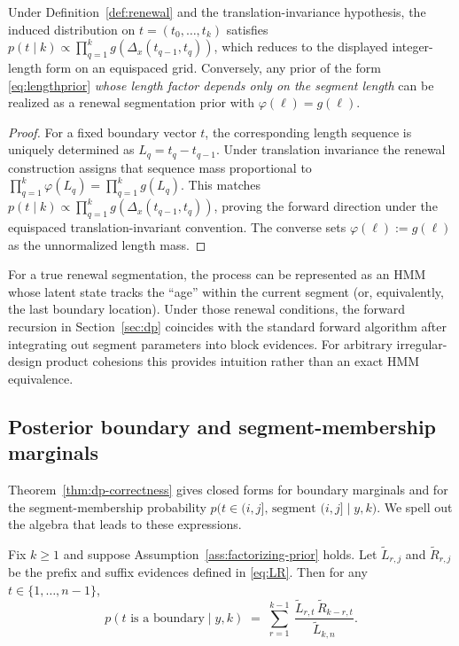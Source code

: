 \begin{proposition}
\label{prop:renewal-equivalence}
Under Definition~\ref{def:renewal} and the translation-invariance hypothesis,
the induced distribution on $t=(t_0,\dots,t_k)$ satisfies
$p(t\mid k)\propto \prod_{q=1}^k g(\Delta_x(t_{q-1},t_q))$, which reduces to the displayed integer-length form on an equispaced grid. Conversely, any prior of the form
\eqref{eq:lengthprior} \emph{whose length factor depends only on the segment length} can be
realized as a renewal segmentation prior with $\varphi(\ell)=g(\ell)$.
\end{proposition}

\begin{proof}
For a fixed boundary vector $t$, the corresponding length sequence is uniquely determined as
$L_q=t_q-t_{q-1}$. Under translation invariance the renewal construction assigns that sequence
mass proportional to $\prod_{q=1}^k \varphi(L_q)=\prod_{q=1}^k g(L_q)$. This matches
$p(t\mid k)\propto\prod_{q=1}^k g(\Delta_x(t_{q-1},t_q))$, proving the forward direction under the equispaced translation-invariant convention. The converse
sets $\varphi(\ell):=g(\ell)$ as the unnormalized length mass.
\end{proof}

\begin{remark}
For a true renewal segmentation, the process can be represented as an HMM whose latent state tracks
the ``age'' within the current segment (or, equivalently, the last boundary location). Under those
renewal conditions, the forward recursion in Section~\ref{sec:dp} coincides with the standard
forward algorithm after integrating out segment parameters into block evidences. For arbitrary
irregular-design product cohesions this provides intuition rather than an exact HMM equivalence.
\end{remark}

\subsection{Posterior boundary and segment-membership marginals}
\label{app:marginals}

Theorem~\ref{thm:dp-correctness} gives closed forms for boundary marginals and for the segment-membership probability
$p\big(t\in(i,j],\,\text{segment }(i,j]\mid y,k\big)$.
We spell out the algebra that leads to these expressions.

\begin{proposition}
\label{prop:boundary-marginals}
Fix $k\ge1$ and suppose Assumption~\ref{ass:factorizing-prior} holds.
Let $\widetilde{L}_{r,j}$ and $\widetilde{R}_{r,j}$ be the prefix and suffix evidences defined in \eqref{eq:LR}.
Then for any $t\in\{1,\dots,n-1\}$,
\begin{equation}
 p(t\text{ is a boundary}\mid y,k)
 \;=\; \sum_{r=1}^{k-1}\ \frac{\widetilde{L}_{r,t}\,\widetilde{R}_{k-r,t}}{\widetilde{L}_{k,n}}.
 \label{eq:app-boundary-marginal}
\end{equation}
\end{proposition}

